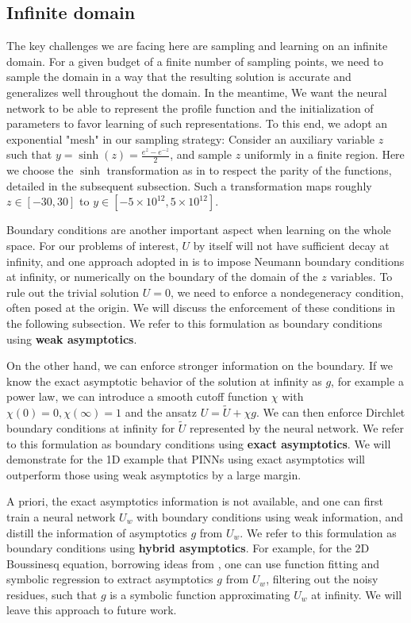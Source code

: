 \documentclass[12pt]{caltech_thesis}
\numberwithin{equation}{section}
\begin{document}
\subsection{Infinite domain}\label{subsec:inf}
The key challenges we are facing here are sampling and learning on an infinite domain.
For a given budget of a finite number of sampling points, we need to sample the domain in a way that
the resulting solution is accurate and generalizes well throughout the domain. In the meantime,
We want the neural network to be able to represent the profile function and the initialization of parameters
to favor learning of such representations. To this end, we adopt an exponential "mesh" in our sampling strategy:
Consider an auxiliary  variable $z$ such that $y = \sinh(z)=\frac{e^z-e^{-z}}{2}$, 
and sample $z$ uniformly in a finite region. Here we choose the $\sinh$ transformation as in \cite{wang2023asymptotic}
to respect the parity of the functions, detailed in the subsequent subsection. Such a transformation
maps roughly $z\in[-30,30]$ to $y\in[-5\times 10^{12},5\times 10^{12}]$.

Boundary conditions are another important aspect when learning on the whole space.
For our problems of interest, $U$ by itself will not have sufficient decay at infinity,
and one approach adopted in \cite{wang2023asymptotic} is to impose Neumann boundary conditions at infinity, or numerically 
on the boundary of the domain of the $z$ variables.
To rule out the trivial solution $U=0$, we need to enforce a nondegeneracy condition,
often posed at the origin. We will discuss the enforcement of these conditions in the following subsection.
We refer to this formulation as boundary conditions using \textbf{weak asymptotics}.

On the other hand, we can enforce stronger information on the boundary. 
If we know the exact asymptotic behavior of the solution at infinity as $g$, for example a power law,
we can introduce a smooth cutoff function $\chi$ with $\chi(0)=0,\chi(\infty)=1$
 and the ansatz $U=\tilde{U}+\chi g$. We can then enforce Dirchlet boundary conditions at infinity for $\tilde{U}$
 represented by the neural network. We refer to this formulation as boundary conditions using \textbf{exact asymptotics}. We will demonstrate for the 1D example that PINNs using exact asymptotics will outperform those using weak asymptotics by a large margin.

A priori, the exact asymptotics information is not available, and one can first train a neural network $U_w$ with 
boundary conditions using weak information, and distill the information of asymptotics $g$ from $U_w$.
We refer to this formulation as boundary conditions using \textbf{hybrid asymptotics}. For example,
for the 2D Boussinesq equation, borrowing ideas from \cite{chen2022stable},
one can use function fitting and symbolic regression to extract asymptotics $g$ from $U_w$, filtering out the noisy residues, such that $g$ is a symbolic function approximating $U_w$ at infinity. We will leave this approach to future work.
\end{document}
